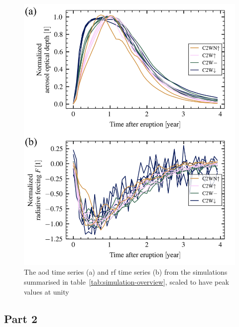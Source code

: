 \documentclass{ametsocV6.1}
\begin{document}
\begin{figure}
  \centering
  \includegraphics[width=0.95\linewidth]{figures/arrays_combined_normalized.png}

  \caption{The \gls{aod} time series (a) and \gls{rf} time series (b) from the simulations
    summarised in table~\ref{tab:simulation-overview}, scaled to have peak values at unity
  }\label{fig:arrays_normalised}
\end{figure}

\subsection{Part 2}
\end{document}
